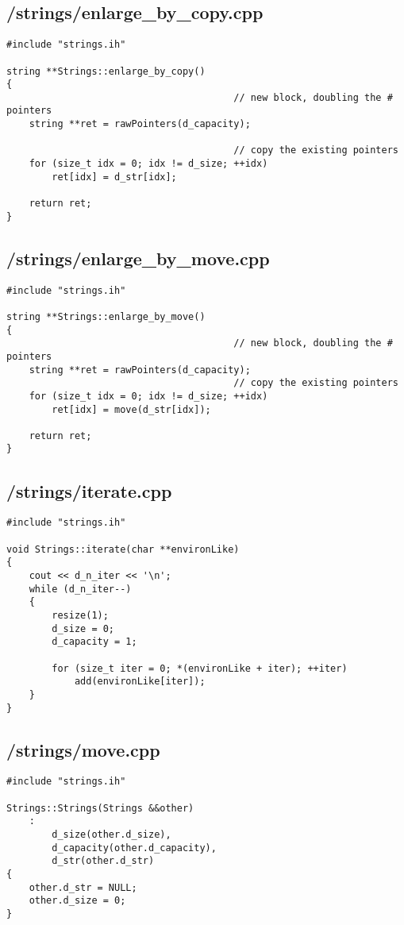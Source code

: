 \documentclass{article}
\begin{document}
\subsection*{/strings/enlarge\_by\_copy.cpp}
\begin{verbatim}
#include "strings.ih"

string **Strings::enlarge_by_copy()
{
                                        // new block, doubling the # pointers
    string **ret = rawPointers(d_capacity);

                                        // copy the existing pointers
    for (size_t idx = 0; idx != d_size; ++idx)
        ret[idx] = d_str[idx];

    return ret;
}

\end{verbatim}
\subsection*{/strings/enlarge\_by\_move.cpp}
\begin{verbatim}
#include "strings.ih"

string **Strings::enlarge_by_move()
{
                                        // new block, doubling the # pointers
    string **ret = rawPointers(d_capacity);
                                        // copy the existing pointers
    for (size_t idx = 0; idx != d_size; ++idx)
        ret[idx] = move(d_str[idx]);

    return ret;
}

\end{verbatim}
\subsection*{/strings/iterate.cpp}
\begin{verbatim}
#include "strings.ih"

void Strings::iterate(char **environLike)
{
    cout << d_n_iter << '\n';
    while (d_n_iter--)
    {
        resize(1);
        d_size = 0;
        d_capacity = 1;

        for (size_t iter = 0; *(environLike + iter); ++iter)
            add(environLike[iter]);
    }
}

\end{verbatim}
\subsection*{/strings/move.cpp}
\begin{verbatim}
#include "strings.ih"

Strings::Strings(Strings &&other)
    :
        d_size(other.d_size),
        d_capacity(other.d_capacity),
        d_str(other.d_str)
{
    other.d_str = NULL;
    other.d_size = 0;
}
\end{verbatim}
\end{document}
